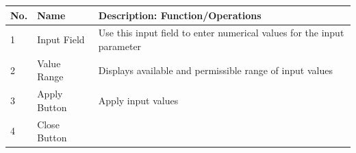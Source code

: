 \begin{longtable}[]{@{}lll@{}}
\toprule
\begin{minipage}[b]{0.04\columnwidth}\raggedright
No.\strut
\end{minipage} & \begin{minipage}[b]{0.23\columnwidth}\raggedright
Name\strut
\end{minipage} & \begin{minipage}[b]{0.65\columnwidth}\raggedright
Description: Function/Operations\strut
\end{minipage}\tabularnewline
\midrule
\endhead
\begin{minipage}[t]{0.04\columnwidth}\raggedright
1\strut
\end{minipage} & \begin{minipage}[t]{0.23\columnwidth}\raggedright
Input Field\strut
\end{minipage} & \begin{minipage}[t]{0.65\columnwidth}\raggedright
Use this input field to enter numerical values for the input
parameter\strut
\end{minipage}\tabularnewline
\begin{minipage}[t]{0.04\columnwidth}\raggedright
2\strut
\end{minipage} & \begin{minipage}[t]{0.23\columnwidth}\raggedright
Value Range\strut
\end{minipage} & \begin{minipage}[t]{0.65\columnwidth}\raggedright
Displays available and permissible range of input values\strut
\end{minipage}\tabularnewline
\begin{minipage}[t]{0.04\columnwidth}\raggedright
3\strut
\end{minipage} & \begin{minipage}[t]{0.23\columnwidth}\raggedright
Apply Button\strut
\end{minipage} & \begin{minipage}[t]{0.65\columnwidth}\raggedright
Apply input values\strut
\end{minipage}\tabularnewline
\begin{minipage}[t]{0.04\columnwidth}\raggedright
4\strut
\end{minipage} & \begin{minipage}[t]{0.23\columnwidth}\raggedright
Close Button\strut
\end{minipage} & \begin{minipage}[t]{0.65\columnwidth}\raggedright

\end{minipage}
\end{longtable}
